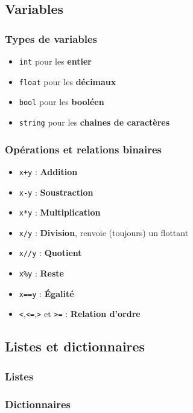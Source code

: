 \documentclass{beamer}
\begin{document}
    \subsection{Variables}
    \begin{frame}
        \frametitle{Types de variables}
        

        \begin{itemize}
            \item \texttt{int} pour les \textbf{entier}
            \item \texttt{float} pour les \textbf{décimaux}
            \item \texttt{bool} pour les \textbf{booléen}
            \item \texttt{string} pour les \textbf{chaines de caractères}
        \end{itemize}
    \end{frame}
    \begin{frame}
        \frametitle{Opérations et relations binaires}
        \begin{itemize}
            \item \texttt{x+y} : \textbf{Addition}
            \item \texttt{x-y} : \textbf{Soustraction}
            \item \texttt{x*y} : \textbf{Multiplication}
            \item \texttt{x/y} : \textbf{Division}, renvoie (toujours) un flottant
            \item \texttt{x//y} : \textbf{Quotient}
            \item \texttt{x\%y} : \textbf{Reste}
            \item \texttt{x==y} : \textbf{\'Egalité}
            \item \texttt{<},\texttt{<=},\texttt{>} et \texttt{>=} : \textbf{Relation d'ordre}
        \end{itemize}
    \end{frame}
    \subsection{Listes et dictionnaires}
    \begin{frame}
        \frametitle{Listes}
        
    \end{frame}
    \begin{frame}
        \frametitle{Dictionnaires}
        
    \end{frame}
\end{document}
